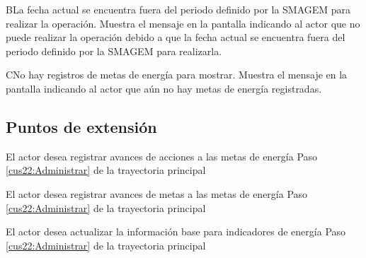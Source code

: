     \begin{UCtrayectoriaA}{B}{La fecha actual se encuentra fuera del periodo definido por la SMAGEM para realizar la operación.}
    \UCpaso[\UCsist] Muestra el mensaje  en la pantalla  indicando al actor que no puede realizar la operación debido a que la fecha actual se encuentra fuera del periodo definido por la SMAGEM para realizarla. 
 \end{UCtrayectoriaA}
 
  \begin{UCtrayectoriaA}{C}{No hay registros de metas de energía para mostrar.}
    \UCpaso[\UCsist] Muestra el mensaje  en la pantalla  indicando al actor que aún no hay metas de energía registradas. 
 \end{UCtrayectoriaA}
 



\subsection{Puntos de extensión}

\UCExtensionPoint
{El actor desea registrar avances de acciones a las metas de energía}
{ Paso \ref{cus22:Administrar} de la trayectoria principal}
{}

\UCExtensionPoint
{El actor desea registrar avances de metas a las metas de energía}
{ Paso \ref{cus22:Administrar} de la trayectoria principal}
{}

\UCExtensionPoint
{El actor desea actualizar la información base para indicadores de energía}
{ Paso \ref{cus22:Administrar} de la trayectoria principal}
{}